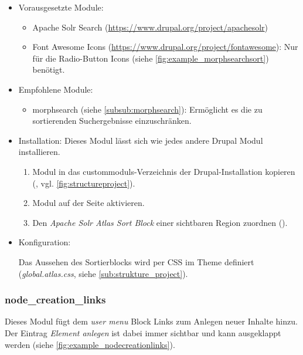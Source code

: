 \begin{itemize}[parsep=0pt, itemsep=5.0pt plus 2.0pt minus 1.0pt, leftmargin=*]
	\item Vorausgesetzte Module:

	\begin{itemize}
		\item Apache Solr Search (\url{https://www.drupal.org/project/apachesolr})

		\item Font Awesome Icons (\url{https://www.drupal.org/project/fontawesome}): Nur für die Radio-Button Icons (siehe \cref{fig:example_morphsearchsort}) benötigt.
	\end{itemize}


	\item Empfohlene Module:

	\begin{itemize}
		\item morphsearch (siehe \cref{subsub:morphsearch}): Ermöglicht es die zu sortierenden Suchergebnisse einzuschränken.
	\end{itemize}


	\item Installation: Dieses Modul lässt sich wie jedes andere Drupal Modul installieren.
	\begin{enumerate}
		\item Modul in das \glspl{custommodul}-Verzeichnis der Drupal-Installation kopieren  (\zB {}, vgl. \cref{fig:structureproject}).
		\item Modul auf der Seite  aktivieren.
		\item Den \textit{Apache Solr Atlas Sort Block} einer sichtbaren Region zuordnen ().
	\end{enumerate}

	\item Konfiguration:

	\noconfig

	Das Aussehen des Sortierblocks wird per CSS im Theme definiert (\zB \textit{global.atlas.css}, siehe \cref{sub:strukture_project}).

\end{itemize}


\newpage
\subsubsection{node\_creation\_links}\label{subsub:nodecreationlinks}
Dieses Modul fügt dem \textit{user menu} Block Links zum Anlegen neuer Inhalte hinzu. Der Eintrag \textit{Element anlegen} ist dabei immer sichtbar und kann ausgeklappt werden (siehe \cref{fig:example_nodecreationlinks}).

